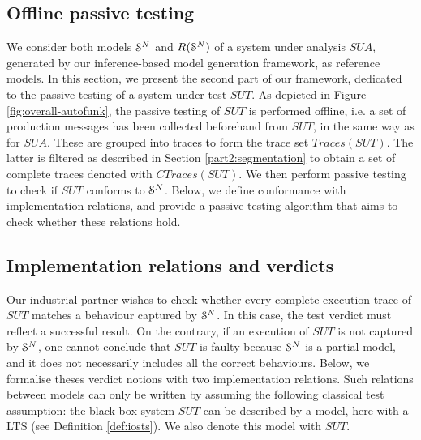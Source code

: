 
\subsection{Offline passive testing}
\label{sec:testing}

We consider both models $\EuScript{S}^{N}$ and
$R(\EuScript{S}^{N})$ of a system under analysis $\mathit{SUA}$,
generated by our inference-based model generation framework, as
reference models. In this section, we present the second part of
our framework, dedicated to the passive testing of a system under
test $\mathit{SUT}$. As depicted in Figure \ref{fig:overall-autofunk},
the passive testing of $\mathit{SUT}$ is performed offline, i.e. a set
of production messages has been collected beforehand from
$\mathit{SUT}$, in the same way as for $\mathit{SUA}$. These are grouped into
traces to form the trace set $Traces({SUT})$. The latter is
filtered as described in Section \ref{part2:segmentation} to
obtain a set of complete traces denoted with $CTraces({SUT})$.
We then perform passive testing to check if $\mathit{SUT}$ conforms
to $\EuScript{S}^{N}$. Below, we define conformance with
implementation relations, and provide a passive testing algorithm
that aims to check whether these relations hold.

\subsection{Implementation relations and verdicts}


Our industrial partner wishes to check whether every complete
execution trace of $\mathit{SUT}$ matches a behaviour captured by
$\EuScript{S}^{N}$. In this case, the test verdict must reflect a
successful result. On the contrary, if an execution of $\mathit{SUT}$ is
not captured by $\EuScript{S}^{N}$, one cannot conclude that
$\mathit{SUT}$ is faulty because $\EuScript{S}^{N}$ is a partial model,
and it does not necessarily includes all the correct
behaviours. Below, we formalise theses verdict notions with two
implementation relations. Such relations between models can only be written
by assuming the following classical test assumption: the
black-box system $\mathit{SUT}$ can be described by a model, here with a
LTS (see Definition \ref{def:iosts}). We also denote
this model with $\mathit{SUT}$.

